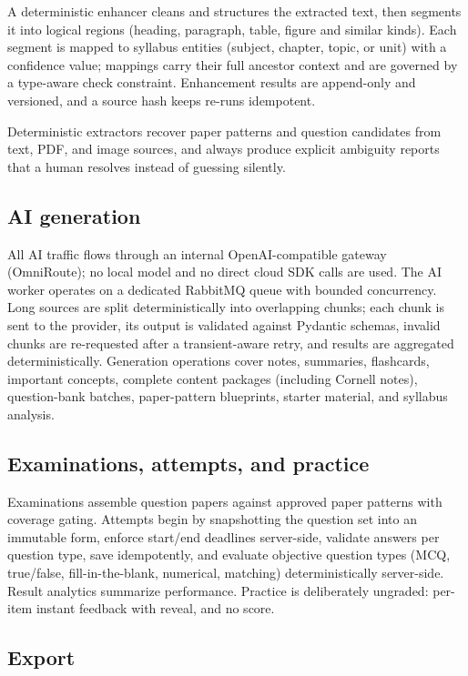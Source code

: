 A deterministic enhancer cleans and structures the extracted text, then
segments it into logical regions (heading, paragraph, table, figure and
similar kinds). Each segment is mapped to syllabus entities (subject, chapter,
topic, or unit) with a confidence value; mappings carry their full ancestor
context and are governed by a type-aware check constraint. Enhancement
results are append-only and versioned, and a source hash keeps re-runs
idempotent.

Deterministic extractors recover paper patterns and question candidates from
text, PDF, and image sources, and always produce explicit ambiguity reports
that a human resolves instead of guessing silently.

\subsection{AI generation}

All AI traffic flows through an internal OpenAI-compatible gateway
(OmniRoute); no local model and no direct cloud SDK calls are used. The AI
worker operates on a dedicated RabbitMQ queue with bounded concurrency.
Long sources are split deterministically into overlapping chunks; each chunk
is sent to the provider, its output is validated against Pydantic schemas,
invalid chunks are re-requested after a transient-aware retry, and results
are aggregated deterministically. Generation operations cover notes,
summaries, flashcards, important concepts, complete content packages
(including Cornell notes), question-bank batches, paper-pattern blueprints,
starter material, and syllabus analysis.

\subsection{Examinations, attempts, and practice}

Examinations assemble question papers against approved paper patterns with
coverage gating. Attempts begin by snapshotting the question set into an
immutable form, enforce start/end deadlines server-side, validate answers per
question type, save idempotently, and evaluate objective question types
(MCQ, true/false, fill-in-the-blank, numerical, matching) deterministically
server-side. Result analytics summarize performance. Practice is deliberately
ungraded: per-item instant feedback with reveal, and no score.

\subsection{Export}

